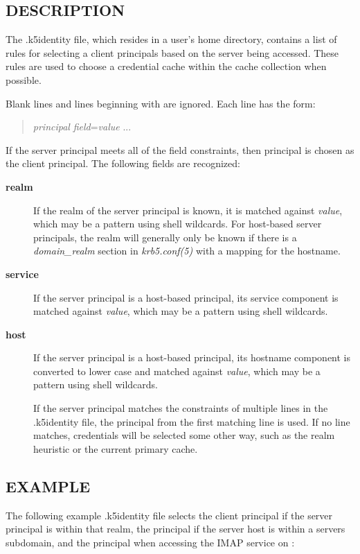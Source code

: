 \documentclass[letterpaper,10pt,english]{sphinxmanual}
\begin{document}
\subsection{DESCRIPTION}
\label{user/user_config/k5identity:description}
The .k5identity file, which resides in a user's home directory,
contains a list of rules for selecting a client principals based on
the server being accessed.  These rules are used to choose a
credential cache within the cache collection when possible.

Blank lines and lines beginning with \code{\#} are ignored.  Each line has
the form:
\begin{quote}

\emph{principal} \emph{field}=\emph{value} ...
\end{quote}

If the server principal meets all of the field constraints, then
principal is chosen as the client principal.  The following fields are
recognized:
\begin{description}
\item[{\textbf{realm}}] \leavevmode
If the realm of the server principal is known, it is matched
against \emph{value}, which may be a pattern using shell wildcards.
For host-based server principals, the realm will generally only be
known if there is a \emph{domain\_realm} section in
\emph{krb5.conf(5)} with a mapping for the hostname.

\item[{\textbf{service}}] \leavevmode
If the server principal is a host-based principal, its service
component is matched against \emph{value}, which may be a pattern using
shell wildcards.

\item[{\textbf{host}}] \leavevmode
If the server principal is a host-based principal, its hostname
component is converted to lower case and matched against \emph{value},
which may be a pattern using shell wildcards.

If the server principal matches the constraints of multiple lines
in the .k5identity file, the principal from the first matching
line is used.  If no line matches, credentials will be selected
some other way, such as the realm heuristic or the current primary
cache.

\end{description}


\subsection{EXAMPLE}
\label{user/user_config/k5identity:example}
The following example .k5identity file selects the client principal
 if the server principal is within that realm,
the principal  if the server host is within
a servers subdomain, and the principal  when
accessing the IMAP service on :
\end{document}

